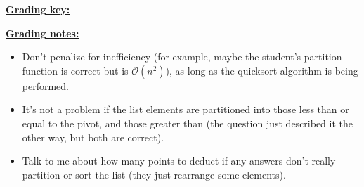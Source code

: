 \documentclass[11pt,fleqn]{article}
\begin{document}
\begin{enumerate}
\begin{info}{\textbf{\underline{Grading key:}}}
\begin{itemize}
            \end{itemize}

            \vspace{-2.5mm}

          \end{info}

          \begin{info}{\textbf{\underline{Grading notes:}}}

            \begin{itemize}

              \addtolength{\itemsep}{2mm}

              \item Don't penalize for inefficiency (for example, maybe the
                    student's partition function is correct but is
                    $\mathcal{O}(n^2)$), as long as the quicksort algorithm
                    is being performed.

              \item It's not a problem if the list elements are partitioned
                    into those less than or equal to the pivot, and those
                    greater than (the question just described it the other
                    way, but both are correct).

              \item Talk to me about how many points to deduct if any
                    answers don't really partition or sort the list (they
                    just rearrange some elements).

            \end{itemize}

            \vspace{-2.5mm}

          \end{info}


  \end{enumerate}
\end{document}

